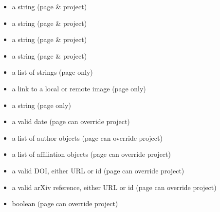 \documentclass[letterpaper,12pt,english]{sphinxmanual}
\begin{document}
\begin{itemize}
\item {} 
\sphinxAtStartPar
{} \sphinxhyphen{} a string (page \& project)

\item {} 
\sphinxAtStartPar
{} \sphinxhyphen{} a string (page \& project)

\item {} 
\sphinxAtStartPar
{} \sphinxhyphen{} a string (page \& project)

\item {} 
\sphinxAtStartPar
{} \sphinxhyphen{} a string (page \& project)

\item {} 
\sphinxAtStartPar
{} \sphinxhyphen{} a list of strings (page only)

\item {} 
\sphinxAtStartPar
{} \sphinxhyphen{} a link to a local or remote image (page only)

\item {} 
\sphinxAtStartPar
{} \sphinxhyphen{} a string (page only)

\item {} 
\sphinxAtStartPar
{} \sphinxhyphen{} a valid date (page can override project)

\item {} 
\sphinxAtStartPar
{} \sphinxhyphen{} a list of author objects (page can override project)

\item {} 
\sphinxAtStartPar
{} \sphinxhyphen{} a list of affiliation objects (page can override project)

\item {} 
\sphinxAtStartPar
{} \sphinxhyphen{} a valid DOI, either URL or id (page can override project)

\item {} 
\sphinxAtStartPar
{} \sphinxhyphen{} a valid arXiv reference, either URL or id (page can override project)

\item {} 
\sphinxAtStartPar
{} \sphinxhyphen{} boolean (page can override project)


\end{itemize}
\end{document}
